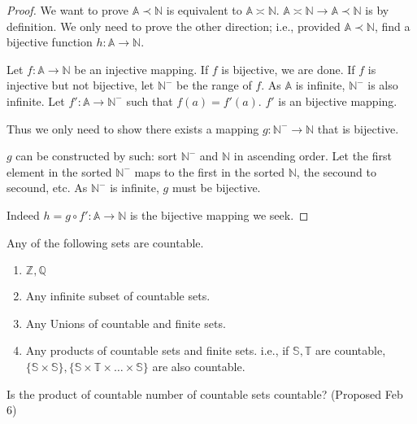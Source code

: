 \documentclass[../note.tex]{subfiles}
\begin{document}
\begin{proof}
	We want to prove $\mathbb{A} \prec \mathbb{N}$ is equivalent to $\mathbb{A} \asymp \mathbb{N}$. $\mathbb{A} \asymp \mathbb{N} \rightarrow \mathbb{A} \prec \mathbb{N}$ is by definition. 
	We only need to prove the other direction; i.e., provided $\mathbb{A} \prec \mathbb{N}$, find a bijective function $h: \mathbb{A} \rightarrow \mathbb{N}$.

	Let $f: \mathbb{A} \rightarrow \mathbb{N}$ be an injective mapping. If $f$ is bijective, we are done. If $f$ is injective but not bijective, let $\mathbb{N}^-$ be the range of $f.$ As $\mathbb{A}$ is infinite, $\mathbb{N}^-$ is also infinite.  
	Let $f': \mathbb{A} \rightarrow \mathbb{N}^-$ such that $f(a) = f'(a).$ $f'$ is an bijective mapping. 
	
    Thus we only need to show there exists a mapping $g: \mathbb{N}^- \rightarrow \mathbb{N}$ that is bijective. 

	$g$ can be constructed by such: sort $\mathbb{N}^-$ and $\mathbb{N}$ in ascending order. Let the first element in the sorted $\mathbb{N}^-$ maps to the first in the sorted $\mathbb{N}$, the secound to secound, etc.
	As $\mathbb{N}^-$ is infinite, $g$ must be bijective.

	Indeed $h = g \circ f': \mathbb{A} \rightarrow \mathbb{N}$ is the bijective mapping we seek. 
\end{proof}

\begin{theorem}
	Any of the following sets are countable.
	\begin{enumerate}
		\item $\mathbb{Z}, \mathbb{Q}$ 
		\item Any infinite subset of countable sets.
		\item Any Unions of countable and finite sets.
		\item Any products of countable sets and finite sets. i.e., if $\mathbb{S}, \mathbb{T}$ are countable, $\{\mathbb{S}\times \mathbb{S}\}, \{\mathbb{S}\times \mathbb{T}\times \dots \times \mathbb{S} \}$ are also countable.
	\end{enumerate}
\end{theorem}

\begin{hypothesis}
Is the product of countable number of countable sets countable? (Proposed Feb 6)
\end{hypothesis}
\end{document}
